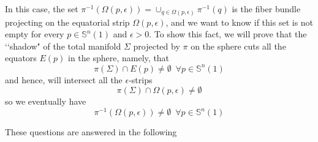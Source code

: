 \documentclass{amsart}
\theoremstyle{definition}
\theoremstyle{remark}
\newcommand{\ese}{\mathbb{S}}
\begin{document}
In this case, the set   $\pi^{-1}(\Omega(p,\epsilon))=\cup_{q \in \Omega(p,\epsilon)} \pi^{-1}(q) $ is the fiber bundle projecting on the equatorial strip $ \Omega(p,\epsilon)$, and we want to know if this set is not empty for every $p \in \ese^n(1)$ and $\epsilon >0$. To show this fact, we will prove that the \lq\lq shadow" of the total manifold $\Sigma$ projected by $\pi$ on the sphere cuts all the equators $E(p)$ in the sphere, namely, that
 $$\pi(\Sigma) \cap E(p) \neq \emptyset\,\,\,\forall p \in \mathbb{S}^n(1)$$ and hence, will intersect all the $\epsilon$-strips
        $$\pi(\Sigma) \cap \Omega(p,\epsilon) \neq \emptyset$$
        \noindent so we eventually have  
        $$\pi^{-1}(\Omega(p,\epsilon))\neq \emptyset\,\,\,\forall p \in \mathbb{S}^n(1)$$
   
These questions are answered in the following
\end{document}
